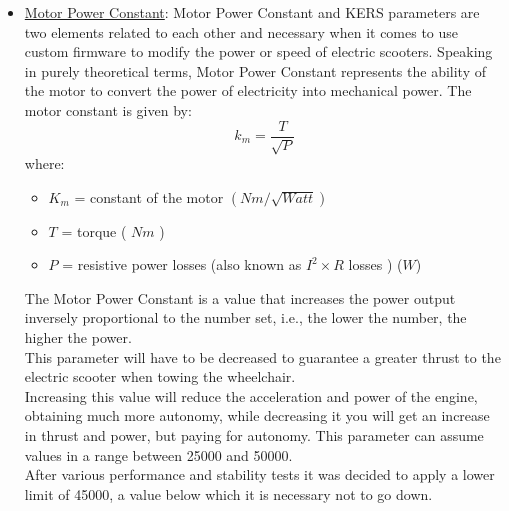 \documentclass[binding=0.6cm,LaM,noexaminfo]{sapthesis}
\begin{document}
\begin{itemize}
    \item \underline{Motor Power Constant}: Motor Power Constant and KERS parameters are two elements related to each other and necessary when it comes to use custom firmware to modify the power or speed of electric scooters. Speaking in purely theoretical terms, Motor Power Constant represents the ability of the motor to convert the power of electricity into mechanical power. The motor constant is given by:
    \begin{equation}
        k_m = \frac{T}{\sqrt{P}}
    \end{equation}
    where: \begin{itemize}
        \item $K_m$ = constant of the motor $(Nm/\sqrt{Watt}) $
        \item $T$ = torque ( $Nm$ )
        \item $P$ = resistive power losses (also known as $I^2 \times R$ losses ) ($W$)    
    \end{itemize}
    The Motor Power Constant is a value that increases the power output inversely proportional to the number set, i.e., the lower the number, the higher the power.\\
    This parameter will have to be decreased to guarantee a greater thrust to the electric scooter when towing the wheelchair.\\
    Increasing this value will reduce the acceleration and power of the engine, obtaining much more autonomy, while decreasing it you will get an increase in thrust and power, but paying for autonomy. This parameter can assume values in a range between 25000 and 50000.\\
    After various performance and stability tests it was decided to apply a lower limit of 45000, a value below which it is necessary not to go down.
\end{itemize}
\end{document}
